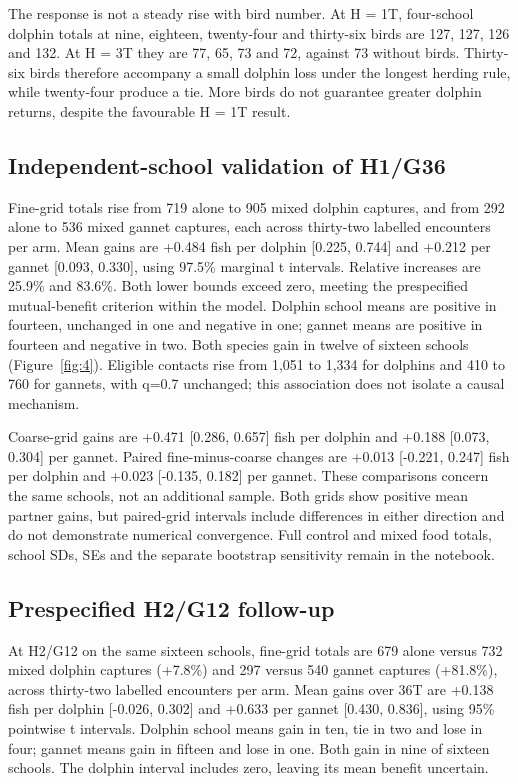 \documentclass[10pt,a4paper,twocolumn]{article}
\begin{document}
The response is not a steady rise with bird number. At H = 1T, four-school dolphin totals at nine, eighteen, twenty-four and thirty-six birds are 127, 127, 126 and 132. At H = 3T they are 77, 65, 73 and 72, against 73 without birds. Thirty-six birds therefore accompany a small dolphin loss under the longest herding rule, while twenty-four produce a tie. More birds do not guarantee greater dolphin returns, despite the favourable H = 1T result.

\subsection{Independent-school validation of H1/G36}
Fine-grid totals rise from 719 alone to 905 mixed dolphin captures, and from 292 alone to 536 mixed gannet captures, each across thirty-two labelled encounters per arm. Mean gains are +0.484 fish per dolphin [0.225, 0.744] and +0.212 per gannet [0.093, 0.330], using 97.5\% marginal t intervals. Relative increases are 25.9\% and 83.6\%. Both lower bounds exceed zero, meeting the prespecified mutual-benefit criterion within the model. Dolphin school means are positive in fourteen, unchanged in one and negative in one; gannet means are positive in fourteen and negative in two. Both species gain in twelve of sixteen schools (Figure~\ref{fig:4}). Eligible contacts rise from 1,051 to 1,334 for dolphins and 410 to 760 for gannets, with q=0.7 unchanged; this association does not isolate a causal mechanism.

Coarse-grid gains are +0.471 [0.286, 0.657] fish per dolphin and +0.188 [0.073, 0.304] per gannet. Paired fine-minus-coarse changes are +0.013 [-0.221, 0.247] fish per dolphin and +0.023 [-0.135, 0.182] per gannet. These comparisons concern the same schools, not an additional sample. Both grids show positive mean partner gains, but paired-grid intervals include differences in either direction and do not demonstrate numerical convergence. Full control and mixed food totals, school SDs, SEs and the separate bootstrap sensitivity remain in the notebook.

\subsection{Prespecified H2/G12 follow-up}
At H2/G12 on the same sixteen schools, fine-grid totals are 679 alone versus 732 mixed dolphin captures (+7.8\%) and 297 versus 540 gannet captures (+81.8\%), across thirty-two labelled encounters per arm. Mean gains over 36T are +0.138 fish per dolphin [-0.026, 0.302] and +0.633 per gannet [0.430, 0.836], using 95\% pointwise t intervals. Dolphin school means gain in ten, tie in two and lose in four; gannet means gain in fifteen and lose in one. Both gain in nine of sixteen schools. The dolphin interval includes zero, leaving its mean benefit uncertain.
\end{document}
